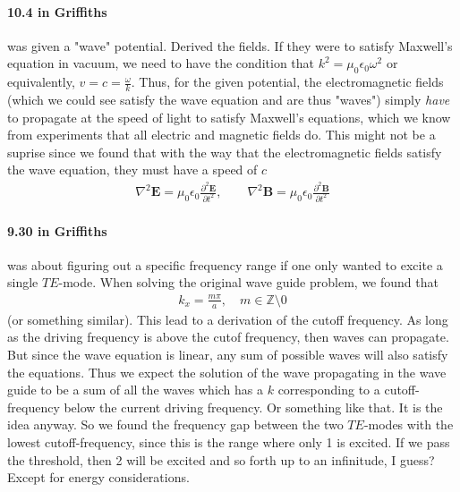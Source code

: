 \paragraph{10.4 in Griffiths} was given a "wave" potential. Derived the fields. If they were to satisfy Maxwell's equation in vacuum, we need to have the condition that \(k^{2} = \mu _0 \epsilon _0 \omega ^{2} \) or equivalently, \(v = c = \frac{\omega}{k}\). Thus, for the given potential, the electromagnetic fields (which we could see satisfy the wave equation and are thus "waves") simply \textit{have} to propagate at the speed of light to satisfy Maxwell's equations, which we know from experiments that all electric and magnetic fields do. This might not be a suprise since we found that with the way that the electromagnetic fields satisfy the wave equation, they must have a speed of \(c\) \begin{align*}
        \nabla ^{2} \mathbf{E} = \mu _0 \epsilon _0 \frac{\partial^{2}  \mathbf{E}}{\partial t^{2} },\qquad \nabla ^{2} \mathbf{B} = \mu _0 \epsilon _0 \frac{\partial^{2}  \mathbf{B}}{\partial t^{2} }
    \end{align*}   

\paragraph{9.30 in Griffiths} was about figuring out a specific frequency range if one only wanted to excite a single \(TE\)-mode. When solving the original wave guide problem, we found that \begin{align*}
    k_x = \frac{m \pi}{a}, \quad m \in \mathbb{Z}\setminus{0} 
\end{align*}  
(or something similar). This lead to a derivation of the cutoff frequency. As long as the driving frequency is above the cutof frequency, then waves can propagate. But since the wave equation is linear, any sum of possible waves will also satisfy the equations. Thus we expect the solution of the wave propagating in the wave guide to be a sum of all the waves which has a \(k\) corresponding to a cutoff-frequency below the current driving frequency. Or something like that. It is the idea anyway. So we found the frequency gap between the two \(TE\)-modes with the lowest cutoff-frequency, since this is the range where only 1 is excited. If we pass the threshold, then 2 will be excited and so forth up to an infinitude, I guess? Except for energy considerations.

